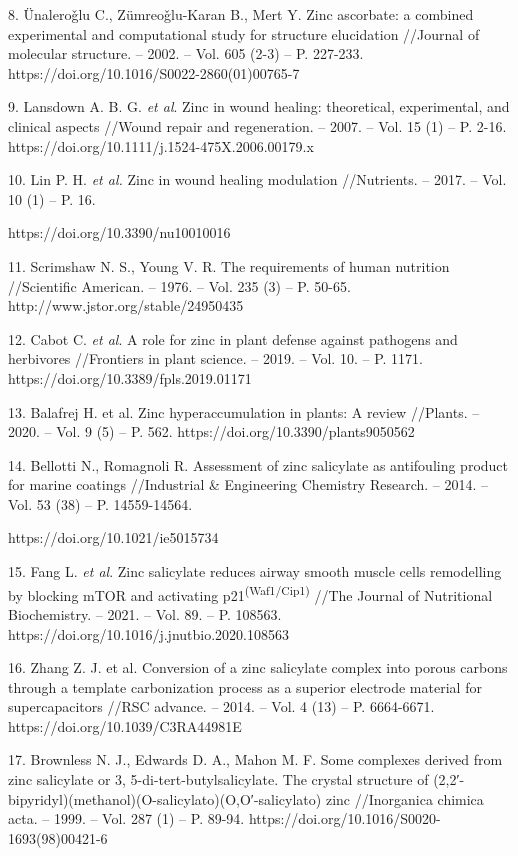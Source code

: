 \begin{noparindent}
8.
  Ünaleroǧlu C., Zümreoǧlu-Karan B., Mert Y. Zinc ascorbate: a combined
  experimental and computational study for structure elucidation
  //Journal of molecular structure. -- 2002. -- Vol. 605 (2-3) -- P.
  227-233. https://doi.org/10.1016/S0022-2860(01)00765-7

9.
  Lansdown A. B. G. \emph{et al}. Zinc in wound healing: theoretical,
  experimental, and clinical aspects //Wound repair and regeneration. --
  2007. -- Vol. 15 (1) -- P. 2-16.
  https://doi.org/10.1111/j.1524-475X.2006.00179.x

10.
  Lin P. H. \emph{et al.} Zinc in wound healing modulation //Nutrients.
  -- 2017. -- Vol. 10 (1) -- P. 16.

  https://doi.org/10.3390/nu10010016

11.
  Scrimshaw N. S., Young V. R. The requirements of human nutrition
  //Scientific American. -- 1976. -- Vol. 235 (3) -- P. 50-65.
  http://www.jstor.org/stable/24950435

12.
  Cabot C. \emph{et al}. A role for zinc in plant defense against
  pathogens and herbivores //Frontiers in plant science. -- 2019. --
  Vol. 10. -- P. 1171. https://doi.org/10.3389/fpls.2019.01171

13.
  Balafrej H. et al. Zinc hyperaccumulation in plants: A review
  //Plants. -- 2020. -- Vol. 9 (5) -- P. 562.
  https://doi.org/10.3390/plants9050562

14.
  Bellotti N., Romagnoli R. Assessment of zinc salicylate as antifouling
  product for marine coatings //Industrial \& Engineering Chemistry
  Research. -- 2014. -- Vol. 53 (38) -- P. 14559-14564.

  https://doi.org/10.1021/ie5015734

15.
  Fang L. \emph{et al}. Zinc salicylate reduces airway smooth muscle
  cells remodelling by blocking mTOR and activating
  p21\textsuperscript{(Waf1/Cip1)} //The Journal of Nutritional
  Biochemistry. -- 2021. -- Vol. 89. -- P. 108563.
  https://doi.org/10.1016/j.jnutbio.2020.108563

16.
  Zhang Z. J. et al. Conversion of a zinc salicylate complex into porous
  carbons through a template carbonization process as a superior
  electrode material for supercapacitors //RSC advance. -- 2014. -- Vol.
  4 (13) -- P. 6664-6671. https://doi.org/10.1039/C3RA44981E

17.
  Brownless N. J., Edwards D. A., Mahon M. F. Some complexes derived
  from zinc salicylate or 3, 5-di-tert-butylsalicylate. The crystal
  structure of (2,2′-bipyridyl)(methanol)(O-salicylato)(O,O′-salicylato)
  zinc //Inorganica chimica acta. -- 1999. -- Vol. 287 (1) -- P. 89-94.
  https://doi.org/10.1016/S0020-1693(98)00421-6


\end{noparindent}
